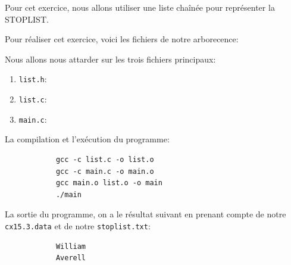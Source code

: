 \documentclass[a4paper,11pt]{article}
\begin{document}
        \bigskip
        \noindent Pour cet exercice, nous allons utiliser une liste chaînée pour représenter la STOPLIST.

        \bigskip
        \noindent Pour réaliser cet exercice, voici les fichiers de notre arborecence:
        
        \begin{figure}[ht]
        \end{figure}

        \noindent Nous allons nous attarder sur les trois fichiers principaux:
        \begin{enumerate}
          \item \texttt{list.h}:
            
          \item \texttt{list.c}:
            
          \item \texttt{main.c}:
            
        \end{enumerate}

        \noindent La compilation et l'exécution du programme:
        \begin{tcolorbox}[colback=lightgray!6, colframe=black, left=-20mm, right=5mm, top=2mm, bottom=-2mm, boxrule=0.1mm]
          \begin{verbatim}
            gcc -c list.c -o list.o
            gcc -c main.c -o main.o
            gcc main.o list.o -o main
            ./main
          \end{verbatim}
        \end{tcolorbox}

        \bigskip
        \noindent La sortie du programme, on a le résultat suivant en prenant compte de notre \texttt{cx15.3.data} et de notre \texttt{stoplist.txt}:
        \begin{tcolorbox}[colback=lightgray!6, colframe=black, left=-20mm, right=5mm, top=2mm, bottom=-2mm, boxrule=0.1mm]
          \begin{verbatim}
            William
            Averell
          \end{verbatim}
        \end{tcolorbox}
\end{document}
